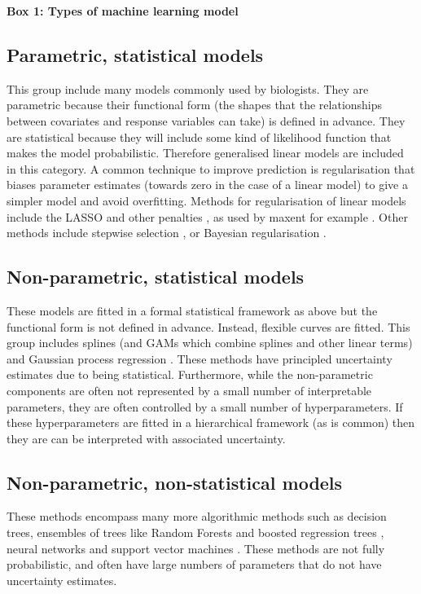 \documentclass[10pt,]{article}
\begin{document}
\begin{figure*}[t]
\centering
\colorbox{boxcolour}{
\begin{minipage}{1\textwidth}


\setlength{\parindent}{3mm}
\noindent\textsf{\textbf{Box 1: Types of machine learning model}}\footnotesize

\vspace{-2mm}
\subsection{Parametric, statistical models}
This group include many models commonly used by biologists.
They are parametric because their functional form (the shapes that the relationships between covariates and response variables can take) is defined in advance.
They are statistical because they will include some kind of likelihood function that makes the model probabilistic.
Therefore generalised linear models are included in this category.
A common technique to improve prediction is regularisation that biases parameter estimates (towards zero in the case of a linear model) to give a simpler model and avoid overfitting.
Methods for regularisation of linear models include the LASSO and other penalties \citep{tibshirani1996regression, zou2005regularization}, as used by maxent for example  \citep{maxent}. 
Other methods include stepwise selection \citep{hocking1976biometrics}, or Bayesian regularisation \citep{park2008bayesian, liu2018bayesian}.


\subsection{Non-parametric, statistical models}
These models are fitted in a formal statistical framework as above but the functional form is not defined in advance.
Instead, flexible curves are fitted.
This group includes splines (and GAMs which combine splines and other linear terms) and Gaussian process regression \citep{rasmussen2004gaussian}.
These methods have principled uncertainty estimates due to being statistical.
Furthermore, while the non-parametric components are often not represented by a small number of interpretable parameters, they are often controlled by a small number of hyperparameters.
If these hyperparameters are fitted in a hierarchical framework (as is common) then they are can be interpreted with associated uncertainty.

\subsection{Non-parametric, non-statistical models}
These methods encompass many more algorithmic methods \citep{crisci2012review} such as decision trees, ensembles of trees like Random Forests \citep{breiman2001random} and boosted regression trees \citep{elith2008working, friedman2001greedy}, neural networks \citep{neuralnets} and support vector machines \citep{svm}.
These methods are not fully probabilistic, and often have large numbers of parameters that do not have uncertainty estimates.


\end{minipage}}
\end{figure*}
\end{document}
